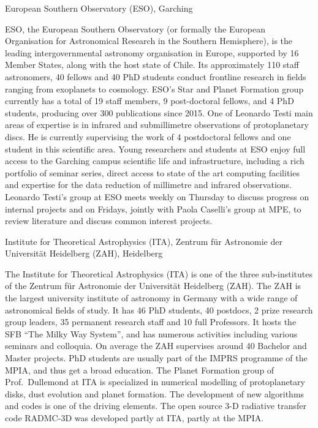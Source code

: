 \documentclass[10pt,fleqn,twoside]{article}
\begin{document}
\begin{Emphasize}
European Southern Observatory (ESO), Garching\\
\end{Emphasize}
ESO, the European Southern Observatory (or formally the European
Organisation for Astronomical Research in the Southern Hemisphere), is the
leading intergovernmental astronomy organisation in Europe, supported by 16
Member States, along with the host state of Chile. Its approximately 110
staff astronomers, 40 fellows and 40 PhD students conduct frontline research
in fields ranging from exoplanets to cosmology. ESO’s Star and Planet
Formation group currently has a total of 19 staff members, 9 post-doctoral
fellows, and 4 PhD students, producing over 300 publications since 2015. One
of Leonardo Testi main areas of expertise is in infrared and submillimetre
observations of protoplanetary discs. He is currently supervising the work
of 4 postdoctoral fellows and one student in this scientific area. Young
researchers and students at ESO enjoy full access to the Garching campus
scientific life and infrastructure, including a rich portfolio of seminar
series, direct access to state of the art computing facilities and expertise
for the data reduction of millimetre and infrared observations. Leonardo
Testi’s group at ESO meets weekly on Thursday to discuss progress on
internal projects and on Fridays, jointly with Paola Caselli’s group at MPE,
to review literature and discuss common interest projects.
\vspace{1em}

\begin{Emphasize}
Institute for Theoretical Astrophysics (ITA), 
Zentrum f\"ur Astronomie der Universit\"at Heidelberg (ZAH), Heidelberg\\
\end{Emphasize}
The Institute for Theoretical Astrophysics (ITA) is one of the three
sub-institutes of the Zentrum f\"ur Astronomie der Universit\"at Heidelberg
(ZAH).  The ZAH is the largest university institute of astronomy in Germany
with a wide range of astronomical fields of study. It has 46 PhD students,
40 postdocs, 2 prize research group leaders, 35 permanent research staff and
10 full Professors. It hosts the SFB ``The Milky Way System'', and has 
numerous activities including various seminars and colloquia. On average
the ZAH supervises around 40 Bachelor and Master projects. PhD students 
are usually part of the IMPRS programme of the MPIA, and thus get a broad
education. The Planet Formation group of Prof.~Dullemond at ITA is specialized
in numerical modelling of protoplanetary disks, dust evolution and 
planet formation. The development of new algorithms and codes is one of the
driving elements. The open source 3-D radiative transfer code {\sc RADMC-3D}
was developed partly at ITA, partly at the MPIA. 
\vspace{1em}
\end{document}
